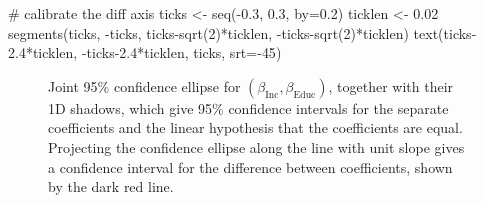 \documentclass[
  letterpaper,
  10pt,
  krantz2]{krantz}
\makeatletter
\newenvironment{Shaded}{\begin{snugshade}}{\end{snugshade}}
\newcommand{\AttributeTok}[1]{\textcolor[rgb]{0.40,0.45,0.13}{#1}}
\newcommand{\CommentTok}[1]{\textcolor[rgb]{0.37,0.37,0.37}{#1}}
\newcommand{\DecValTok}[1]{\textcolor[rgb]{0.68,0.00,0.00}{#1}}
\newcommand{\FloatTok}[1]{\textcolor[rgb]{0.68,0.00,0.00}{#1}}
\newcommand{\FunctionTok}[1]{\textcolor[rgb]{0.28,0.35,0.67}{#1}}
\newcommand{\NormalTok}[1]{\textcolor[rgb]{0.00,0.23,0.31}{#1}}
\newcommand{\OtherTok}[1]{\textcolor[rgb]{0.00,0.23,0.31}{#1}}
\newcommand{\SpecialCharTok}[1]{\textcolor[rgb]{0.37,0.37,0.37}{#1}}
\newenvironment{kframe}{%
  \medskip{}
  \setlength{\fboxsep}{.8em}
  \def\at@end@of@kframe{}%
  \ifinner\ifhmode%
  \def\at@end@of@kframe{\end{minipage}}%
  \begin{minipage}{\columnwidth}%
  \fi\fi%
  \def\FrameCommand##1{\hskip\@totalleftmargin \hskip-\fboxsep
  \colorbox{shadecolor}{##1}\hskip-\fboxsep
      \hskip-\linewidth \hskip-\@totalleftmargin \hskip\columnwidth}%
  \MakeFramed {\advance\hsize-\width
    \@totalleftmargin\z@ \linewidth\hsize
    \@setminipage}}%
{\par\unskip\endMakeFramed%
  \at@end@of@kframe}
\renewenvironment{Shaded}{\begin{kframe}}{\end{kframe}}
\makeatother
\begin{document}
\begin{Shaded}
\begin{Highlighting}[]
\CommentTok{\# calibrate the diff axis}
\NormalTok{ticks }\OtherTok{\textless{}{-}} \FunctionTok{seq}\NormalTok{(}\SpecialCharTok{{-}}\FloatTok{0.3}\NormalTok{, }\FloatTok{0.3}\NormalTok{, }\AttributeTok{by=}\FloatTok{0.2}\NormalTok{)}
\NormalTok{ticklen }\OtherTok{\textless{}{-}} \FloatTok{0.02}
\FunctionTok{segments}\NormalTok{(ticks, }\SpecialCharTok{{-}}\NormalTok{ticks, ticks}\SpecialCharTok{{-}}\FunctionTok{sqrt}\NormalTok{(}\DecValTok{2}\NormalTok{)}\SpecialCharTok{*}\NormalTok{ticklen, }\SpecialCharTok{{-}}\NormalTok{ticks}\SpecialCharTok{{-}}\FunctionTok{sqrt}\NormalTok{(}\DecValTok{2}\NormalTok{)}\SpecialCharTok{*}\NormalTok{ticklen)}
\FunctionTok{text}\NormalTok{(ticks}\FloatTok{{-}2.4}\SpecialCharTok{*}\NormalTok{ticklen, }\SpecialCharTok{{-}}\NormalTok{ticks}\FloatTok{{-}2.4}\SpecialCharTok{*}\NormalTok{ticklen, ticks, }\AttributeTok{srt=}\SpecialCharTok{{-}}\DecValTok{45}\NormalTok{)}
\end{Highlighting}
\end{Shaded}

\begin{figure}


\caption{\label{fig-duncan-beta-diff}Joint 95\% confidence ellipse for
\((\beta_{\text{Inc}}, \beta_{\text{Educ}})\), together with their 1D
shadows, which give 95\% confidence intervals for the separate
coefficients and the linear hypothesis that the coefficients are equal.
Projecting the confidence ellipse along the line with unit slope gives a
confidence interval for the difference between coefficients, shown by
the dark red line.}

\end{figure}%
\end{document}
